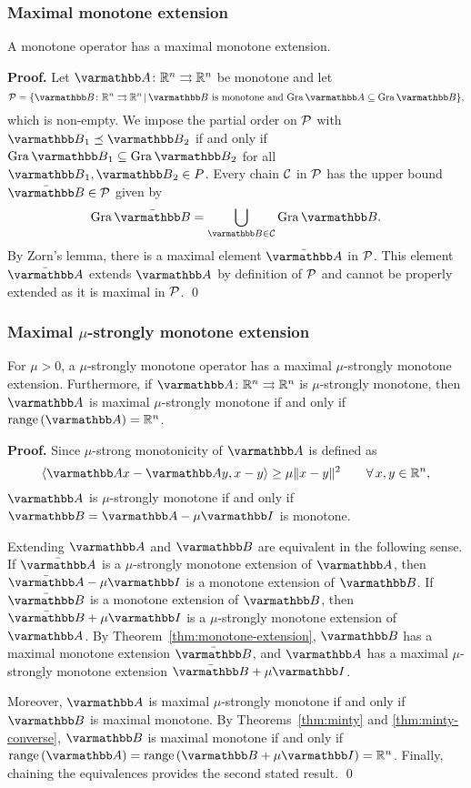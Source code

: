 \documentclass[10pt,mathserif]{beamer}
\begin{document}
\begin{frame}
\frametitle{Maximal monotone extension}
\setcounter{theorem}{12}
\begin{theorem}
\label{thm:monotone-extension}
A monotone operator has a maximal monotone extension.
\end{theorem}
\textbf{Proof.}
Let $\opA\colon\reals^n\rightrightarrows \reals^n$ be monotone and let
\[
\cP=\{\opB\colon\reals^n\rightrightarrows \reals^n\,|\,\opB\text{ is monotone and } \gra\opA\subseteq\gra\opB\},
\]
which is non-empty. We impose the partial order on ${\mathcal{P}}$ with $\opB_1\preceq \opB_2$ if and only if $\gra \opB_1\subseteq\gra\opB_2$ for all $\opB_1,\opB_2\in P$.
Every chain ${\mathcal{C}}$ in ${\mathcal{P}}$ has the upper bound $\bar{\opB}\in \cP$ given by
\[
\gra \bar{\opB}=\bigcup_{\opB \in \cC}\gra \opB.
\]
By Zorn's lemma, there is a maximal element $\bar{\opA}$ in ${\mathcal{P}}$. This element $\bar{\opA}$ extends $\opA$ by definition of ${\mathcal{P}}$ and cannot be properly extended as it is maximal in ${\mathcal{P}}$.
\qed
\end{frame}

\begin{frame}[plain]
\frametitle{Maximal $\mu$-strongly monotone extension}
\begin{theorem}
\label{thm:sm-condition}
For $\mu>0$, a $\mu$-strongly monotone operator has a maximal $\mu$-strongly monotone extension.
Furthermore, if $\opA\colon\reals^n\rightrightarrows \reals^n$ is $\mu$-strongly monotone, then $\opA$ is maximal $\mu$-strongly monotone if and only if $\range( \opA)=\reals^n$.
\end{theorem}
\textbf{Proof.}
Since $\mu$-strong monotonicity of $\opA$ is defined as 
\[
\langle \opA x-\opA y,x-y\rangle \ge \mu \|x-y\|^2\qquad\forall\,x,y\in\reals^n,
\]
$\opA$ is $\mu$-strongly monotone if and only if $\opB=\opA-\mu\opI$ is monotone.

\vspace{0.05in}
Extending $\opA$ and $\opB$ are equivalent in the following sense.
If $\bar{\opA}$ is a $\mu$-strongly monotone extension of $\opA$, then $\bar{\opA}-\mu \opI$ is a monotone extension of $\opB$.
If $\bar{\opB}$ is a monotone extension of $\opB$, then $\bar{\opB}+\mu \opI$ is a $\mu$-strongly monotone extension of $\opA$.
By Theorem~\ref{thm:monotone-extension}, $\opB$ has a maximal monotone extension $\bar{\opB}$, and $\opA$ has a maximal $\mu$-strongly monotone extension $\bar{\opB}+\mu \opI$.

\vspace{0.05in}

Moreover, $\opA$ is maximal $\mu$-strongly monotone if and only if $\opB$ is maximal monotone.
By Theorems~\ref{thm:minty} and \ref{thm:minty-converse}, $\opB$ is maximal monotone if and only if $\range (\opA)=\range (\opB+\mu\opI)=\reals^n$.
Finally, chaining the equivalences provides the second stated result.
\qed
\end{frame}
\end{document}
